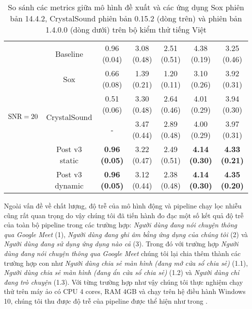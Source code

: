 \begin{table}[h]
\begin{tabular}{l c c c c c c}
				\multirow{6}{*}{$\text{SNR}=20$}        &Baseline       & 0.96 (0.04)   & 3.08 (0.48)   & 2.51 (0.51)   & 4.38 (0.19)  & 3.25 (0.46) \\
				&Sox    & 0.66 (0.08)   & 1.39 (0.21)   & 1.20 (0.11)   & 3.10 (0.26)   & 3.92 (0.31) \\
				&\multirow{2}{*}{CrystalSound}   & 0.51 (0.06)   & 3.30 (0.48)   & 2.64 (0.46)   & 4.01 (0.29)   & 3.94 (0.30) \\
				&       &  -  & 3.47 (0.44)   & 2.89 (0.48)   & 4.00 (0.29)   & 3.97 (0.31) \\
				&Post v3 static & \textbf{0.96 (0.05)}   & 3.22 (0.47)   & 2.49 (0.51)   & \textbf{4.14 (0.30)}   & \textbf{4.33 (0.21)} \\
				&Post v3 dynamic        & \textbf{0.96 (0.05)}   & 3.12 (0.44)   & 2.38 (0.48)   & \textbf{4.14 (0.30)}   & \textbf{4.35 (0.20)} \\
				\hline
			\end{tabular}
			\caption{So sánh các metrics giữa mô hình đề xuất và các ứng dụng Sox phiên bản 14.4.2, CrystalSound phiên bản 0.15.2 (dòng trên) và phiên bản 1.4.0.0 (dòng dưới) trên bộ kiểm thử tiếng Việt}
			\label{re::compare_models_prebuilt}
		\end{table}
	
	Ngoài vấn đề về chất lượng, độ trễ của mô hình động và pipeline chạy lọc nhiễu cũng rất quan trọng do vậy chúng tôi đã tiến hành đo đạc một số kết quả độ trễ của toàn bộ pipeline trong các trường hợp: \textit{Người dùng đang nói chuyện thông qua Google Meet} (1), \textit{Người dùng đang ghi âm bằng ứng dụng của chúng tôi} (2) và \textit{Người dùng đang sử dụng ứng dụng nào cả} (3). Trong đó với trường hợp \textit{Người dùng đang nói chuyện thông qua Google Meet} chúng tôi lại chia thêm thành các trường hợp con như \textit{Người dùng chia sẻ màn hình (đang mở cửa sổ chia sẻ)} (1.1), \textit{Người dùng chia sẻ màn hình (đang ẩn cửa sổ chia sẻ)} (1.2) và \textit{Người dùng chỉ đang trò chuyện} (1.3). Với từng trường hợp như vậy chúng tôi thực nghiệm chạy thử trên máy ảo có CPU 4 cores, RAM 4GB và chạy trên hệ điều hành Windows 10, chúng tôi thu được độ trễ của pipeline được thể hiện như trong .
	
